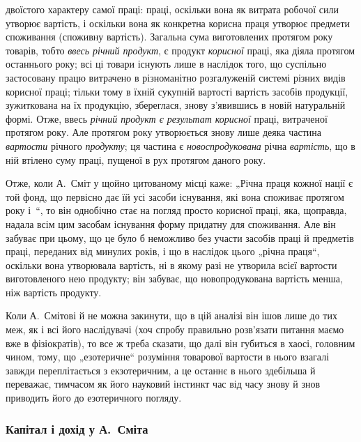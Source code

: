 \parcont{}  %
двоїстого характеру самої праці: праці, оскільки вона як витрата робочої сили утворює вартість, і
оскільки вона як конкретна корисна праця утворює предмети споживання (споживну вартість). Загальна
сума виготовлених протягом року товарів, тобто \emph{ввесь річний продукт}, є продукт \emph{корисної} праці, яка
діяла протягом останнього року; всі ці
товари існують лише в наслідок того, що суспільно застосовану працю витрачено в різноманітно
розгалуженій системі різних видів корисної праці; тільки тому в їхній сукупній вартості вартість
засобів продукції, зужиткована на їх продукцію, збереглася, знову з’явившись в новій натуральній
формі. Отже, ввесь \emph{річний продукт є результат корисної} праці, витраченої протягом року. Але протягом
року утворюється знову лише деяка частина \emph{вартости} річного \emph{продукту}; ця частина є \emph{новоспродукована}
річна \emph{вартість}, що в ній втілено суму праці, пущеної в рух протягом даного року.

Отже, коли А.~Сміт у щойно цитованому місці каже: „Річна праця кожної нації є той фонд, що первісно
дає їй усі засоби існування, які вона споживає протягом року і~“, то він однобічно стає на
погляд просто корисної праці, яка, щоправда, надала всім цим засобам існування форму придатну для
споживання. Але він забуває при цьому, що це
було б неможливо без участи засобів праці й предметів праці, переданих від минулих років, і що в
наслідок цього „річна праця“, оскільки вона утворювала вартість, ні в якому разі не утворила всієї
вартости виготовленого нею продукту; він забуває, що новопродукована вартість менша, ніж вартість
продукту.

Коли А.~Смітові й не можна закинути, що в цій аналізі він ішов лише до тих меж, як і всі його
наслідувачі (хоч спробу правильно розв’язати питання маємо вже в фізіократів), то все ж треба
сказати, що далі він губиться в хаосі, головним чином, тому, що „езотеричне“ розуміння товарової
вартости в нього взагалі завжди переплітається з екзотеричним, а це останнє в нього здебільша й
переважає, тимчасом як його науковий інстинкт час від часу знову й знов приводить його до
езотеричного погляду.

\subsubsection{Капітал і дохід у А.~Сміта}

